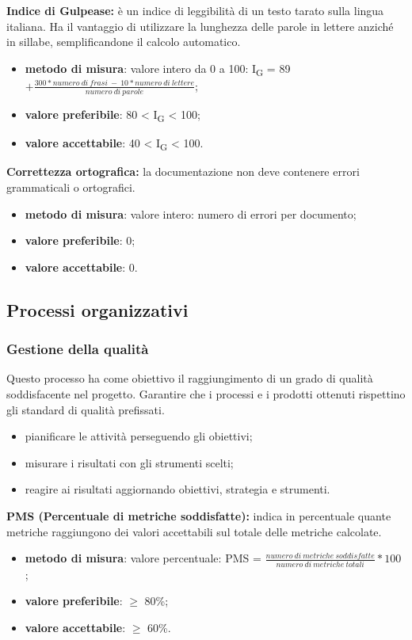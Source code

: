 \textbf{Indice di Gulpease:} è un indice di leggibilità di un testo tarato sulla lingua italiana. 
Ha il vantaggio di utilizzare la lunghezza delle parole in lettere anziché in sillabe, semplificandone il calcolo automatico. 
\begin{itemize}
    \item \textbf{metodo di misura}: valore intero da 0 a 100: I\textsubscript{G} = 89 $+ \frac{300*numero \ di \ frasi \ - \ 10*numero \ di \ lettere}{numero \ di \ parole}$;
    \item \textbf{valore preferibile}: 80 < I\textsubscript{G} < 100;
    \item \textbf{valore accettabile}: 40 < I\textsubscript{G} < 100.
\end{itemize}
\textbf{Correttezza ortografica:} la documentazione non deve contenere errori grammaticali o ortografici. 
\begin{itemize}
    \item \textbf{metodo di misura}: valore intero: numero di errori per documento;
    \item \textbf{valore preferibile}: 0;
    \item \textbf{valore accettabile}: 0.
\end{itemize}
\subsection{Processi organizzativi}
\subsubsection{Gestione della qualità}
Questo processo ha come obiettivo il raggiungimento di un grado di qualità soddisfacente nel progetto.
Garantire che i processi e i prodotti ottenuti rispettino gli standard di qualità prefissati.
\begin{itemize}
    \item pianificare le attività perseguendo gli obiettivi;
    \item misurare i risultati con gli strumenti scelti;
    \item reagire ai risultati aggiornando obiettivi, strategia e strumenti.
\end{itemize}
\textbf{PMS (Percentuale di metriche soddisfatte):} indica in percentuale quante metriche raggiungono dei valori accettabili sul totale delle metriche calcolate.
\begin{itemize}
    \item \textbf{metodo di misura}: valore percentuale: PMS = $\frac{numero \ di \ metriche \ soddisfatte}{numero \ di \ metriche \ totali} * 100$ ;
    \item \textbf{valore preferibile}: $\geq$ 80\%;
    \item \textbf{valore accettabile}: $\geq$ 60\%.
\end{itemize}
\newpage





